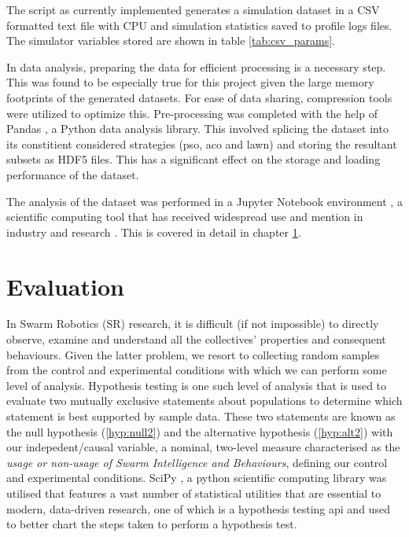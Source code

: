 \documentclass{report}
\begin{document}
The script as currently implemented generates a simulation dataset in a CSV formatted text file with CPU and simulation statistics saved to profile logs files. The simulator variables stored are shown in table \ref{tab:csv_params}.

In data analysis, preparing the data for efficient processing is a necessary step. This was found to be especially true for this project given the large memory footprints of the generated datasets. For ease of data sharing, compression tools were utilized to optimize this. Pre-processing was completed with the help of Pandas \cite{Pandas}, a Python data analysis library. This involved splicing the dataset into its constitient considered strategies (pso, aco and lawn) and storing the resultant subsets as HDF5 files. This has a significant effect on the storage and loading performance of the dataset.

The analysis of the dataset was performed in a Jupyter Notebook environment \cite{Jupyter}, a scientific computing tool that has received widespread use and mention in industry and research \cite{Helen2014} \cite{ACM2017}. This is covered in detail in chapter \ref{evaluation}.

\chapter{Evaluation} \label{evaluation}

In Swarm Robotics (SR) research, it is difficult (if not impossible) to directly observe, examine and understand all the collectives' properties and consequent behaviours. Given the latter problem, we resort to collecting random samples from the control and experimental conditions with which we can perform some level of analysis. Hypothesis testing is one such level of analysis that is used to evaluate two mutually exclusive statements about populations to determine which statement is best supported by sample data. These two statements are known as the null hypothesis (\ref{hyp:null2}) and the alternative hypothesis (\ref{hyp:alt2}) with our indepedent/causal variable, a nominal, two-level measure characterised as the \textit{usage or non-usage of Swarm Intelligence and Behaviours}, defining our control and experimental conditions. SciPy \cite{SCIPY}, a python scientific computing library was utilised that features a vast number of statistical utilities that are essential to modern, data-driven research, one of which is a hypothesis testing api and \cite{bmgi} used to better chart the steps taken to perform a hypothesis test.
\end{document}
